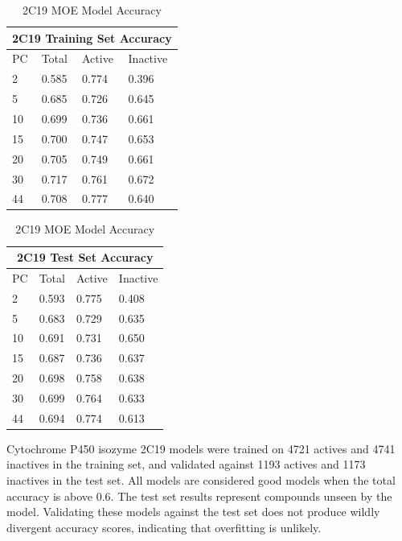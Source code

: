 \begin{table}[!htbp]
\begin{minipage}{.5\linewidth}
\centering
\begin{tabular}{|l|l|l|l|}
\hline
\multicolumn{4}{|c|}{2C19 Training Set Accuracy} \\ \hline
PC & Total          & Active          & Inactive \\ \hline
2  & 0.585          & 0.774           & 0.396   \\ \hline
5  & 0.685          & 0.726           & 0.645   \\ \hline
10 & 0.699          & 0.736           & 0.661    \\ \hline
15 & 0.700          & 0.747           & 0.653    \\ \hline
20 & 0.705          & 0.749           & 0.661    \\ \hline
30 & 0.717          & 0.761           & 0.672    \\ \hline
44 & 0.708          & 0.777           & 0.640    \\ \hline
\end{tabular}
\end{minipage}%
\begin{minipage}{.5\linewidth}
\centering
\begin{tabular}{|l|l|l|l|}
\hline
\multicolumn{4}{|c|}{2C19 Test Set Accuracy}       \\ \hline
PC & Total          & Active          & Inactive   \\ \hline
2  & 0.593          & 0.775           & 0.408      \\ \hline
5  & 0.683          & 0.729           & 0.635      \\ \hline
10 & 0.691          & 0.731           & 0.650      \\ \hline
15 & 0.687          & 0.736           & 0.637      \\ \hline
20 & 0.698          & 0.758           & 0.638      \\ \hline
30 & 0.699          & 0.764           & 0.633      \\ \hline
44 & 0.694          & 0.774           & 0.613      \\ \hline
\end{tabular}
\end{minipage}
\caption{2C19 MOE Model Accuracy}
\end{table}

Cytochrome P450 isozyme 2C19 models were trained on 4721 actives and 4741 inactives in the training set, and validated against 1193 actives and 1173 inactives in the test set. All models are considered good models when the  total accuracy is above 0.6.  The test set results represent compounds unseen by the model. Validating these models against the test set does not produce wildly divergent accuracy scores, indicating that overfitting is unlikely. 


